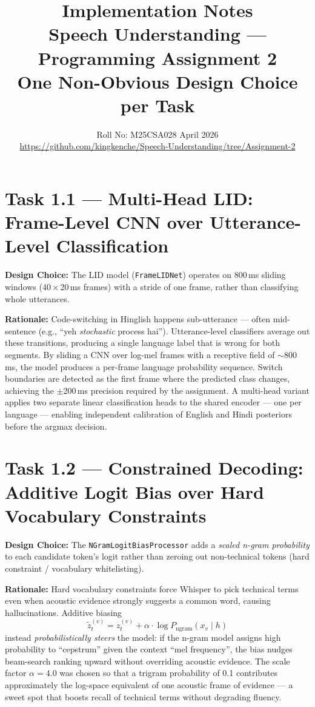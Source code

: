 \documentclass[11pt,onecolumn]{article}
\title{\textbf{Implementation Notes}\\
\large Speech Understanding --- Programming Assignment 2\\[4pt]
\normalsize One Non-Obvious Design Choice per Task}
\author{Roll No: M25CSA028 \quad April 2026\\
\small \url{https://github.com/kingkenche/Speech-Understanding/tree/Assignment-2}}
\date{}
\begin{document}
\maketitle

\section{Task 1.1 --- Multi-Head LID: Frame-Level CNN over Utterance-Level Classification}

\textbf{Design Choice:} The LID model (\texttt{FrameLIDNet}) operates on 800\,ms sliding windows
(40\,$\times$\,20\,ms frames) with a stride of one frame, rather than classifying whole utterances.

\textbf{Rationale:} Code-switching in Hinglish happens sub-utterance --- often mid-sentence
(e.g., ``yeh \textit{stochastic} process hai''). Utterance-level classifiers average out these
transitions, producing a single language label that is wrong for both segments. By sliding a CNN
over log-mel frames with a receptive field of $\sim$800\,ms, the model produces a per-frame
language probability sequence. Switch boundaries are detected as the first frame where the
predicted class changes, achieving the $\pm$200\,ms precision required by the assignment. A
multi-head variant applies two separate linear classification heads to the shared encoder --- one
per language --- enabling independent calibration of English and Hindi posteriors before the argmax
decision.

\section{Task 1.2 --- Constrained Decoding: Additive Logit Bias over Hard Vocabulary Constraints}

\textbf{Design Choice:} The \texttt{NGramLogitBiasProcessor} adds a \textit{scaled n-gram
probability} to each candidate token's logit rather than zeroing out non-technical tokens (hard
constraint / vocabulary whitelisting).

\textbf{Rationale:} Hard vocabulary constraints force Whisper to pick technical terms even when
acoustic evidence strongly suggests a common word, causing hallucinations. Additive biasing
\[
\tilde{z}_t^{(v)} = z_t^{(v)} + \alpha \cdot \log P_{\text{ngram}}(x_v \mid h)
\]
instead \textit{probabilistically steers} the model: if the n-gram model assigns high probability
to ``cepstrum'' given the context ``mel frequency'', the bias nudges beam-search ranking upward
without overriding acoustic evidence. The scale factor $\alpha = 4.0$ was chosen so that a
trigram probability of 0.1 contributes approximately the log-space equivalent of one acoustic
frame of evidence --- a sweet spot that boosts recall of technical terms without degrading
fluency.
\end{document}
